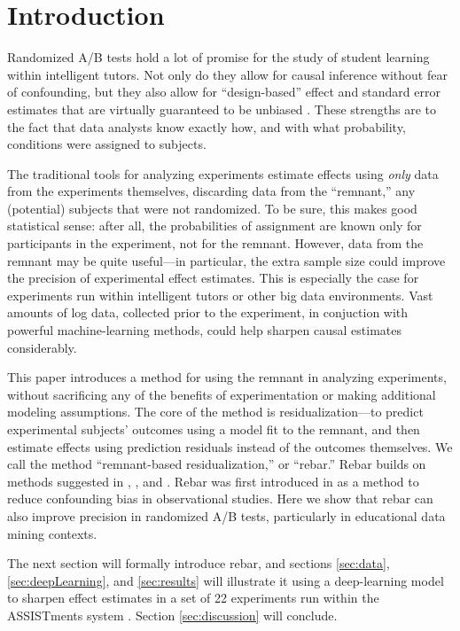 \documentclass{edm_template}
\begin{document}
\section{Introduction}
Randomized A/B tests hold a lot of promise for the study of student learning within intelligent tutors. 
Not only do they allow for causal inference without fear of confounding, but they also allow for ``design-based'' effect and standard error estimates that are virtually guaranteed to be unbiased \cite{schochet2015statistical}.
These strengths are to the fact that data analysts know exactly how, and with what probability, conditions were assigned to subjects.

The traditional tools for analyzing experiments estimate effects using \emph{only} data from the experiments themselves, discarding data from the ``remnant,'' any (potential) subjects that were not randomized. 
To be sure, this makes good statistical sense: after all, the probabilities of assignment are known only for participants in the experiment, not for the remnant. 
However, data from the remnant may be quite useful---in particular, the extra sample size could improve the precision of experimental effect estimates.
This is especially the case for experiments run within intelligent tutors or other big data environments.
Vast amounts of log data, collected prior to the experiment, in conjuction with powerful machine-learning methods, could help sharpen causal estimates considerably. 

This paper introduces a method for using the remnant in analyzing experiments, without sacrificing any of the benefits of experimentation or making additional modeling assumptions. 
The core of the method is residualization---to predict experimental subjects' outcomes using a model fit to the remnant, and then estimate effects using prediction residuals instead of the outcomes themselves. 
We call the method ``remnant-based residualization,'' or ``rebar.''
Rebar builds on methods suggested in \cite{rosenbaum}, \cite{tame}, and \cite{aronow}. Rebar was first introduced in \cite{salesRebar} as a method to reduce confounding bias in observational studies. 
Here we show that rebar can also improve precision in randomized A/B tests, particularly in educational data mining contexts. 

The next section will formally introduce rebar, and sections \ref{sec:data}, \ref{sec:deepLearning}, and \ref{sec:results} will illustrate it using a deep-learning model to sharpen effect estimates in a set of 22 experiments run within the ASSISTments system \cite{data}. Section \ref{sec:discussion} will conclude. 
\end{document}
